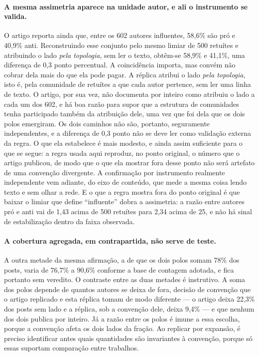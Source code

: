 \paragraph{A mesma assimetria aparece na unidade autor, e ali o instrumento se
valida.} O artigo reporta ainda que, entre os 602 autores influentes, 58,6\% são
pró e 40,9\% anti. Reconstruindo esse conjunto pelo mesmo limiar de 500 retuítes e
atribuindo o lado \emph{pela topologia}, sem ler o texto, obtêm-se 58,9\% e 41,1\%,
uma diferença de 0,3 ponto percentual. A coincidência importa, mas convém não
cobrar dela mais do que ela pode pagar. A réplica atribui o lado \emph{pela
topologia}, isto é, pela comunidade de retuítes a que cada autor pertence, sem ler
uma linha de texto. O artigo, por sua vez, não documenta por inteiro como atribuiu
o lado a cada um dos 602, e há boa razão para supor que a estrutura de comunidades
tenha participado também da atribuição dele, uma vez que foi dela que os dois polos
emergiram. Os dois caminhos não são, portanto, seguramente independentes, e a
diferença de 0,3 ponto não se deve ler como validação externa da regra. O que ela
estabelece é mais modesto, e ainda assim suficiente para o que se segue: a regra
usada aqui reproduz, no ponto original, o número que o artigo publicou, de modo que
o que ela mostrar fora desse ponto não será artefato de uma convenção divergente. A
confirmação por instrumento realmente independente vem adiante, do eixo de
conteúdo, que mede a mesma coisa lendo texto e sem olhar a rede. E o que a regra
mostra fora do ponto original é que baixar o limiar que define ``influente'' dobra
a assimetria: a razão
entre autores pró e anti vai de 1,43 acima de 500 retuítes para 2,34 acima de 25, e
não há sinal de estabilização dentro da faixa observada.

\paragraph{A cobertura agregada, em contrapartida, não serve de teste.} A outra
metade da mesma afirmação, a de que os dois polos somam 78\% dos posts, varia de
76,7\% a 90,6\% conforme a base de contagem adotada, e fica portanto sem veredito. O
contraste entre as duas metades é instrutivo. A soma dos polos depende de quantos
autores se deixa de fora, decisão de convenção que o artigo replicado e esta
réplica tomam de modo diferente — o artigo deixa 22,3\% dos posts sem lado e a
réplica, sob a convenção dele, deixa 9,4\% — e que nenhum dos dois publica por
inteiro. Já a razão entre os polos é imune a essa escolha, porque a convenção
afeta os dois lados da fração. Ao replicar por expansão, é preciso identificar antes
quais quantidades são invariantes à convenção, porque só essas suportam comparação
entre trabalhos.

